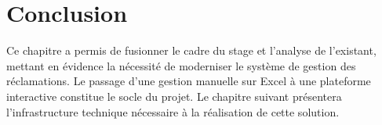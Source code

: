 \section*{Conclusion}
Ce chapitre a permis de fusionner le cadre du stage et l'analyse de l'existant, mettant en évidence la nécessité de moderniser le système de gestion des réclamations. Le passage d'une gestion manuelle sur Excel à une plateforme interactive constitue le socle du projet. Le chapitre suivant présentera l'infrastructure technique nécessaire à la réalisation de cette solution.
